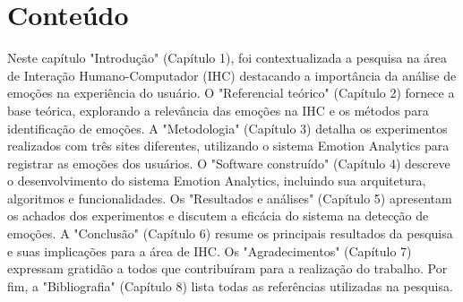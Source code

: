 \section{Conteúdo}

Neste capítulo "Introdução" (Capítulo 1), foi contextualizada a pesquisa na área de Interação Humano-Computador (IHC) destacando a importância da análise de emoções na experiência do usuário. O "Referencial teórico" (Capítulo 2) fornece a base teórica, explorando a relevância das emoções na IHC e os métodos para identificação de emoções. A "Metodologia" (Capítulo 3) detalha os experimentos realizados com três sites diferentes, utilizando o sistema Emotion Analytics para registrar as emoções dos usuários. O "Software construído" (Capítulo 4) descreve o desenvolvimento do sistema Emotion Analytics, incluindo sua arquitetura, algoritmos e funcionalidades. Os "Resultados e análises" (Capítulo 5) apresentam os achados dos experimentos e discutem a eficácia do sistema na detecção de emoções. A "Conclusão" (Capítulo 6) resume os principais resultados da pesquisa e suas implicações para a área de IHC. Os "Agradecimentos" (Capítulo 7) expressam gratidão a todos que contribuíram para a realização do trabalho. Por fim, a "Bibliografia" (Capítulo 8) lista todas as referências utilizadas na pesquisa.
